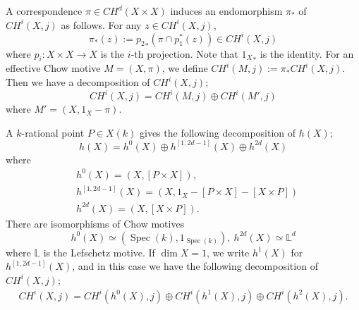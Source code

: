 \documentclass[a4paper,12pt]{amsart}
\numberwithin{equation}{section}
\theoremstyle{definition}
\begin{document}
A correspondence $\pi\in CH^d(X\times X)$ induces an endomorphism $\pi_\ast$ of $CH^i(X,j)$ as follows.
For any $z\in CH^i(X,j)$, 
$$
\pi_\ast(z):={p_2}_\ast(\pi \cap p_1^\ast(z))\in CH^i(X,j)
$$
where $p_i:X\times X\to X$ is the $i$-th projection.
Note that ${1_X}_\ast$ is the identity.
For an effective Chow motive $M=(X,\pi)$, we define 
$
CH^i(M,j):=\pi_\ast CH^i(X,j)$.
Then we have a decomposition of $CH^i(X,j)$;
$$
CH^i(X,j)=CH^i(M,j)\oplus CH^i(M',j)
$$
where $M'=(X,1_X-\pi)$.


A $k$-rational point $P\in X(k)$ gives the following decomposition of $h(X)$;
$$
h(X)=h^0(X) \oplus h^{[1,2d-1]}(X) \oplus h^{2d}(X) 
$$
where 
\begin{align*}
&h^0(X)=(X, [P\times X]),\\
&h^{[1,2d-1]}(X)=(X, 1_X-[P\times X]-[X\times P])\\
&h^{2d}(X)=(X, [X\times P]).
\end{align*}
There are isomorphisms of Chow motives
$$
h^0(X)\simeq (\operatorname{Spec}(k), 1_{\operatorname{Spec}(k)}),\ h^{2d}(X)\simeq \mathbb{L}^{d}
$$
where $\mathbb{L}$ is the Lefschetz motive.
If $\dim X=1$, we write $h^1(X)$ for $h^{[1,2d-1]}(X)$, and in this case we have the following decomposition of $CH^i(X,j)$;
\begin{align}
    CH^i(X,j)=CH^i(h^0(X),j)\oplus CH^i(h^1(X),j)\oplus CH^i(h^2(X),j).
\end{align}
\end{document}
